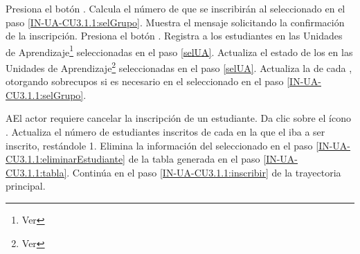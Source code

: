 \begin{UCtrayectoria}
    \UCpaso[\UCactor]  \label{IN-UA-CU3.1.1:inscribir}Presiona el botón .  
    \UCpaso Calcula el número de  que se inscribirán al  seleccionado en el paso \ref{IN-UA-CU3.1.1:selGrupo}.
    \UCpaso Muestra el mensaje  solicitando la confirmación de la inscripción.
    \UCpaso[\UCactor]  \label{IN-UA-CU3.1.1:confirmar}Presiona el botón .
    \UCpaso Registra a los estudiantes en las Unidades de Aprendizaje\footnote{Ver } seleccionadas en el paso \ref{selUA}.
    \UCpaso Actualiza el estado de los  en las Unidades de Aprendizaje\footnote{Ver } seleccionadas en el paso \ref{selUA}.
    \UCpaso Actualiza la  de cada , otorgando sobrecupos si es necesario en el  seleccionado en el paso \ref{IN-UA-CU3.1.1:selGrupo}.
\end{UCtrayectoria}


\begin{UCtrayectoriaA}{A}{El actor requiere cancelar la inscripción de un estudiante.}
	\UCpaso[\UCactor]  \label{IN-UA-CU3.1.1:eliminarEstudiante}Da clic sobre el ícono \IUBorrar.
	\UCpaso Actualiza el número de estudiantes inscritos de cada  en la que el  iba a ser inscrito, restándole 1.
	\UCpaso Elimina la información del  seleccionado en el paso \ref{IN-UA-CU3.1.1:eliminarEstudiante} de la tabla generada en el paso \ref{IN-UA-CU3.1.1:tabla}.
	\UCpaso Continúa en el paso \ref{IN-UA-CU3.1.1:inscribir}  de la trayectoria principal.
\end{UCtrayectoriaA}

